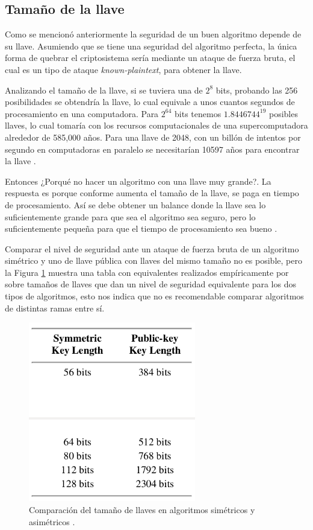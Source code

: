 \subsection{Tamaño de la llave} \label{secTamanoLlave}
Como se mencionó anteriormente la seguridad de un buen algoritmo depende de su llave. Asumiendo que se tiene una seguridad del algoritmo perfecta, la única forma de quebrar el criptosistema sería mediante un ataque de fuerza bruta, el cual es un tipo de ataque \textit{known-plaintext}, para obtener la llave. 

Analizando el tamaño de la llave, si se tuviera una de $2^8$ bits, probando las 256 posibilidades se obtendría la llave, lo cual equivale a unos cuantos segundos de procesamiento en una computadora. Para $2^{64}$ bits tenemos $1.8446744^{19}$ posibles llaves, lo cual tomaría con los recursos computacionales de una supercomputadora alrededor de 585,000 años. Para una llave de 2048, con un billón de intentos por segundo en computadoras en paralelo se necesitarían 10597 años para encontrar la llave \citep{bruce}. 


Entonces ¿Porqué no hacer un algoritmo con una llave muy grande?. La respuesta es porque conforme aumenta el tamaño de la llave, se paga en tiempo de procesamiento. Así se debe obtener un balance donde la llave sea lo suficientemente grande para que sea el algoritmo sea seguro, pero lo suficientemente pequeña para que el tiempo de procesamiento sea bueno \citep{bruce}.

Comparar el nivel de seguridad ante un ataque de fuerza bruta de un algoritmo simétrico y uno de llave pública con llaves del mismo tamaño no es posible, pero la Figura \ref{figVariacionLlaves} muestra una tabla con equivalentes realizados empíricamente por \cite{bruce} sobre tamaños de llaves que dan un nivel de seguridad equivalente para los dos tipos de algoritmos, esto nos indica que no es recomendable comparar algoritmos de distintas ramas entre sí.

\begin{figure}
	\centering
	\includegraphics[width=0.65\textwidth]{./images/figVariacionLlaves}
	\caption{Comparación del tamaño de llaves en algoritmos simétricos y asimétricos \citep{bruce}.}
	\label{figVariacionLlaves}
\end{figure}

